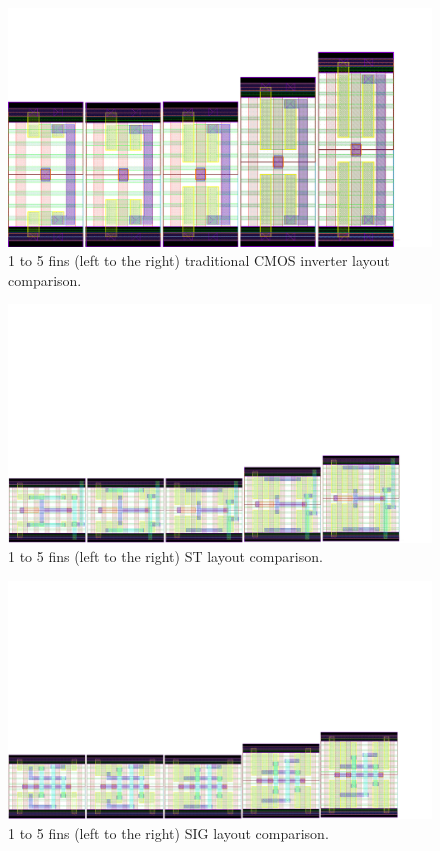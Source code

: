 \documentclass[diss,pgmicro,english]{iiufrgs}
\begin{document}
\begin{figure}[]
\centering
\includegraphics[width=1.5\textwidth, trim={0cm 0cm 3cm 3cm},clip, angle=90]{INVComp.pdf}
\caption{1 to 5 fins (left to the right) traditional CMOS inverter layout comparison.}
\label{fig:invComp}
\end{figure}

\begin{figure}[]
\centering
\includegraphics[width=1.5\textwidth, trim={0cm 0cm 2cm 12cm},clip, angle=90]{STComp.pdf}
\caption{1 to 5 fins (left to the right) ST layout comparison.}
\label{fig:stComp}
\end{figure}

\begin{figure}[]
\centering
\includegraphics[width=1.5\textwidth, trim={0cm 0cm 2cm 12cm},clip, angle=90]{SIGComp.pdf}
\caption{1 to 5 fins (left to the right) SIG layout comparison.}
\label{fig:sigComp}
\end{figure}
\end{document}

